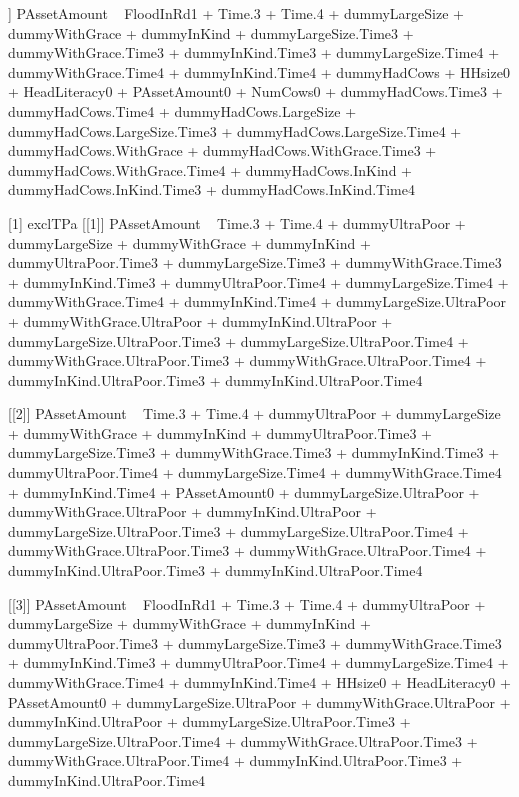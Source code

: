 \begin{Schunk}
\begin{Soutput}
[[6]]
PAssetAmount ~ FloodInRd1 + Time.3 + Time.4 + dummyLargeSize + 
    dummyWithGrace + dummyInKind + dummyLargeSize.Time3 + dummyWithGrace.Time3 + 
    dummyInKind.Time3 + dummyLargeSize.Time4 + dummyWithGrace.Time4 + 
    dummyInKind.Time4 + dummyHadCows + HHsize0 + HeadLiteracy0 + 
    PAssetAmount0 + NumCows0 + dummyHadCows.Time3 + dummyHadCows.Time4 + 
    dummyHadCows.LargeSize + dummyHadCows.LargeSize.Time3 + dummyHadCows.LargeSize.Time4 + 
    dummyHadCows.WithGrace + dummyHadCows.WithGrace.Time3 + dummyHadCows.WithGrace.Time4 + 
    dummyHadCows.InKind + dummyHadCows.InKind.Time3 + dummyHadCows.InKind.Time4

[1] exclTPa
[[1]]
PAssetAmount ~ Time.3 + Time.4 + dummyUltraPoor + dummyLargeSize + 
    dummyWithGrace + dummyInKind + dummyUltraPoor.Time3 + dummyLargeSize.Time3 + 
    dummyWithGrace.Time3 + dummyInKind.Time3 + dummyUltraPoor.Time4 + 
    dummyLargeSize.Time4 + dummyWithGrace.Time4 + dummyInKind.Time4 + 
    dummyLargeSize.UltraPoor + dummyWithGrace.UltraPoor + dummyInKind.UltraPoor + 
    dummyLargeSize.UltraPoor.Time3 + dummyLargeSize.UltraPoor.Time4 + 
    dummyWithGrace.UltraPoor.Time3 + dummyWithGrace.UltraPoor.Time4 + 
    dummyInKind.UltraPoor.Time3 + dummyInKind.UltraPoor.Time4

[[2]]
PAssetAmount ~ Time.3 + Time.4 + dummyUltraPoor + dummyLargeSize + 
    dummyWithGrace + dummyInKind + dummyUltraPoor.Time3 + dummyLargeSize.Time3 + 
    dummyWithGrace.Time3 + dummyInKind.Time3 + dummyUltraPoor.Time4 + 
    dummyLargeSize.Time4 + dummyWithGrace.Time4 + dummyInKind.Time4 + 
    PAssetAmount0 + dummyLargeSize.UltraPoor + dummyWithGrace.UltraPoor + 
    dummyInKind.UltraPoor + dummyLargeSize.UltraPoor.Time3 + 
    dummyLargeSize.UltraPoor.Time4 + dummyWithGrace.UltraPoor.Time3 + 
    dummyWithGrace.UltraPoor.Time4 + dummyInKind.UltraPoor.Time3 + 
    dummyInKind.UltraPoor.Time4

[[3]]
PAssetAmount ~ FloodInRd1 + Time.3 + Time.4 + dummyUltraPoor + 
    dummyLargeSize + dummyWithGrace + dummyInKind + dummyUltraPoor.Time3 + 
    dummyLargeSize.Time3 + dummyWithGrace.Time3 + dummyInKind.Time3 + 
    dummyUltraPoor.Time4 + dummyLargeSize.Time4 + dummyWithGrace.Time4 + 
    dummyInKind.Time4 + HHsize0 + HeadLiteracy0 + PAssetAmount0 + 
    dummyLargeSize.UltraPoor + dummyWithGrace.UltraPoor + dummyInKind.UltraPoor + 
    dummyLargeSize.UltraPoor.Time3 + dummyLargeSize.UltraPoor.Time4 + 
    dummyWithGrace.UltraPoor.Time3 + dummyWithGrace.UltraPoor.Time4 + 
    dummyInKind.UltraPoor.Time3 + dummyInKind.UltraPoor.Time4


\end{Soutput}
\end{Schunk}
